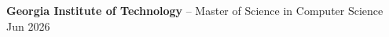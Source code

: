 \textbf{Georgia Institute of Technology} -- Master of Science in Computer Science \hfill Jun 2026 \\
